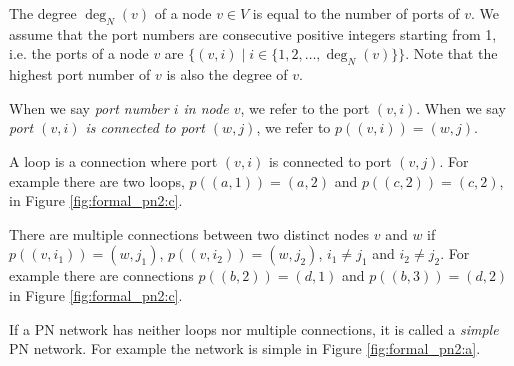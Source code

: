 The degree $\deg_N(v)$ of a node $v \in V$ is equal to the number of ports of $v$.
We assume that the port numbers are consecutive positive integers starting from 1, i.e. the ports of a node $v$ are $\{(v, i) \mid i \in \{1, 2, \dotsc, \deg_N(v)\}\}$.
Note that the highest port number of $v$ is also the degree of $v$.

When we say \emph{port number $i$ in node $v$}, we refer to the port $(v, i)$.
When we say \emph{port $(v, i)$ is connected to port $(w, j)$}, we refer to $p((v, i)) = (w, j)$.

A loop is a connection where port $(v, i)$ is connected to port $(v, j)$.
For example there are two loops, $p((a, 1)) = (a, 2)$ and $p((c,2)) = (c,2)$, in Figure \ref{fig:formal_pn2:c}.

There are multiple connections between two distinct nodes $v$ and $w$ if $p((v, i_1)) = (w, j_1)$, $p((v, i_2)) = (w, j_2)$, $i_1 \neq j_1$ and $i_2 \neq j_2$.
For example there are connections $p((b, 2)) = (d, 1)$ and $p((b, 3)) = (d, 2)$ in Figure \ref{fig:formal_pn2:c}.

If a PN network has neither loops nor multiple connections, it is called a \emph{simple} PN network.
For example the network is simple in Figure \ref{fig:formal_pn2:a}.


